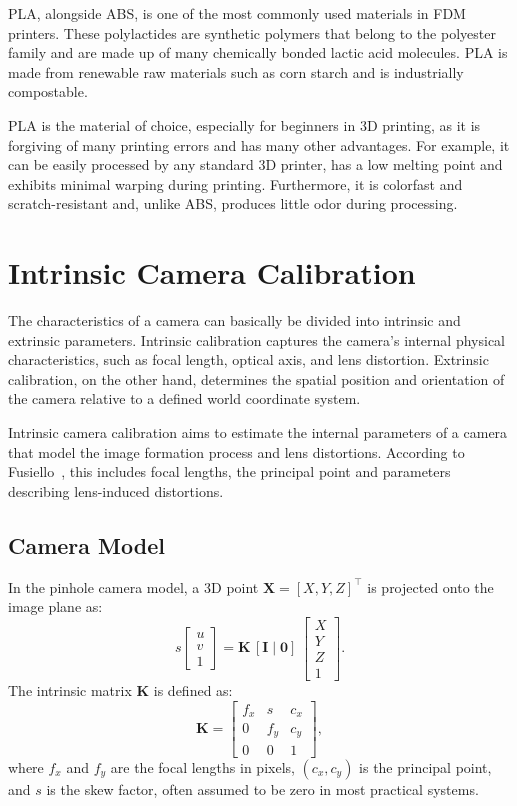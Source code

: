 \documentclass[english, bachelor, utf8]{base/thesis_telematics}
\begin{document}
PLA, alongside ABS, is one of the most commonly used materials in FDM printers. 
These polylactides are synthetic polymers that belong to the polyester family and are made up of many chemically bonded 
lactic acid molecules. PLA is made from renewable raw materials such as corn starch and is industrially compostable. 

PLA is the material of choice, especially for beginners in 3D printing, as it is forgiving of many printing errors 
and has many other advantages. For example, it can be easily processed by any standard 3D printer, has a low melting 
point and exhibits minimal warping during printing. Furthermore, it is colorfast and scratch-resistant and, unlike ABS, 
produces little odor during processing.~\cite{material4print2024pla}


\section{Intrinsic Camera Calibration}
The characteristics of a camera can basically be divided into intrinsic and extrinsic parameters.
Intrinsic calibration captures the camera's internal physical characteristics, such as focal length,
 optical axis, and lens distortion.
Extrinsic calibration, on the other hand, determines the spatial position and orientation of the camera 
relative to a defined world coordinate system.

Intrinsic camera calibration aims to estimate the internal parameters of a camera that model the image 
formation process and lens distortions. According to Fusiello~\cite{Fusiello2024}, this includes focal 
lengths, the principal point and parameters describing lens-induced distortions.

\subsection*{Camera Model}
In the pinhole camera model, a 3D point $\mathbf{X} = [X, Y, Z]^\top$ is projected onto the image 
plane as:
\[
s \begin{bmatrix} u \\ v \\ 1 \end{bmatrix}
= \mathbf{K} \, [\mathbf{I} \mid \mathbf{0}] \,
\begin{bmatrix} X \\ Y \\ Z \\ 1 \end{bmatrix}.
\]
The intrinsic matrix $\mathbf{K}$ is defined as:
\[
\mathbf{K} = 
\begin{bmatrix}
f_x & s & c_x \\
0 & f_y & c_y \\
0 & 0 & 1
\end{bmatrix},
\]
where $f_x$ and $f_y$ are the focal lengths in pixels, $(c_x, c_y)$ is the principal point, and 
$s$ is the skew factor, often assumed to be zero in most practical systems.
\end{document}
